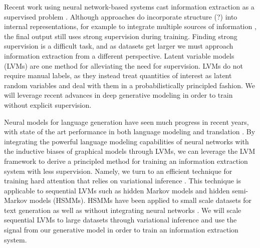 \documentclass[11pt]{article}
\begin{document}
Recent work using neural network-based systems cast information extraction
as a supervised problem
\citep{wiseman2017d2t,dossantos2015classification}.
Although approaches do incorporate structure (?) into internal representations,
for example to integrate multiple sources of information \citep{weissenborn17},
the final output still uses strong supervision during training.
Finding strong supervision is a difficult task, and as datasets get larger
we must approach information extraction from a different perspective.
Latent variable models (LVMs) are one method for alleviating the need for supervision.
LVMs do not require manual labels, as they instead treat quantities of interest
as latent random variables and deal with them in a probabilistically principled 
fashion.
We will leverage recent advances in deep generative modeling in order to
train without explicit supervision.

Neural models for language generation have seen much progress in recent years,
with state of the art performance in both language modeling and translation
\citep{yang2017moslm,allattn}.
By integrating the powerful language modeling capabilities of neural networks with
the inductive biases of graphical models through LVMs,
we can leverage the LVM framework to derive a principled method
for training an information extraction system with less supervision.
Namely, we turn to an efficient technique for training hard attention 
that relies on variational inference \citep{deng2018attn}.
This technique is applicable to sequential LVMs such as hidden Markov models 
and hidden semi-Markov models (HSMMs).
HSMMs have been applied to small scale datasets for text generation \citep{wiseman2018template}
as well as without integrating neural networks \citep{liang2009semalign}.
We will scale sequential LVMs to large datasets through variational inference and use
the signal from our generative model in order to train an information extraction system.

\end{document}
